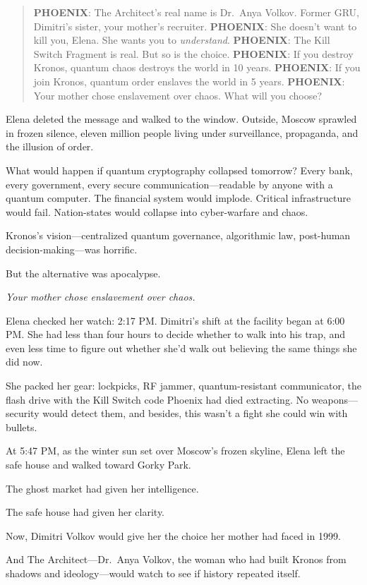 \begin{quote}
\textbf{PHOENIX}: The Architect's real name is Dr.~Anya Volkov. Former GRU, Dimitri's sister, your mother's recruiter. \textbf{PHOENIX}: She doesn't want to kill you, Elena. She wants you to \emph{understand}. \textbf{PHOENIX}: The Kill Switch Fragment is real. But so is the choice. \textbf{PHOENIX}: If you destroy Kronos, quantum chaos destroys the world in 10 years. \textbf{PHOENIX}: If you join Kronos, quantum order enslaves the world in 5 years. \textbf{PHOENIX}: Your mother chose enslavement over chaos. What will you choose?
\end{quote}

Elena deleted the message and walked to the window. Outside, Moscow sprawled in frozen silence, eleven million people living under surveillance, propaganda, and the illusion of order.

What would happen if quantum cryptography collapsed tomorrow? Every bank, every government, every secure communication---readable by anyone with a quantum computer. The financial system would implode. Critical infrastructure would fail. Nation-states would collapse into cyber-warfare and chaos.

Kronos's vision---centralized quantum governance, algorithmic law, post-human decision-making---was horrific.

But the alternative was apocalypse.

\emph{Your mother chose enslavement over chaos.}

Elena checked her watch: 2:17 PM. Dimitri's shift at the facility began at 6:00 PM. She had less than four hours to decide whether to walk into his trap, and even less time to figure out whether she'd walk out believing the same things she did now.

She packed her gear: lockpicks, RF jammer, quantum-resistant communicator, the flash drive with the Kill Switch code Phoenix had died extracting. No weapons---security would detect them, and besides, this wasn't a fight she could win with bullets.

At 5:47 PM, as the winter sun set over Moscow's frozen skyline, Elena left the safe house and walked toward Gorky Park.

The ghost market had given her intelligence.

The safe house had given her clarity.

Now, Dimitri Volkov would give her the choice her mother had faced in 1999.

And The Architect---Dr.~Anya Volkov, the woman who had built Kronos from shadows and ideology---would watch to see if history repeated itself.

